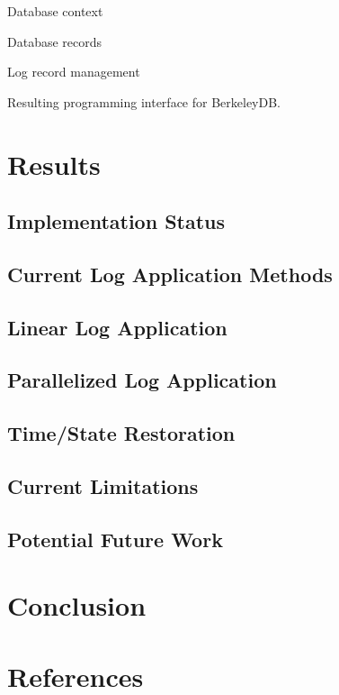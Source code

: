 \documentclass{article}
\begin{document}
Database context

Database records

Log record management

Resulting programming interface for BerkeleyDB.

\section{Results}
\subsection{Implementation Status}
\subsection{Current Log Application Methods}
\subsection{Linear Log Application}
\subsection{Parallelized Log Application}
\subsection{Time/State Restoration}
\subsection{Current Limitations}
\subsection{Potential Future Work}
\section{Conclusion}
\section{References}


\end{document}
